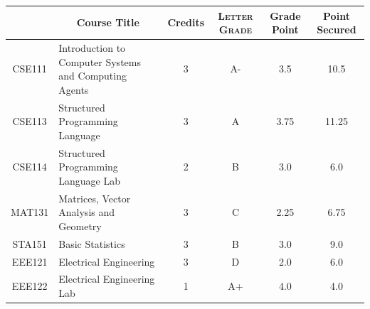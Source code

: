 \documentclass[11pt]{article}
\newcommand*{\numtwo}[1]{\pgfmathprintnumber[
                    fixed, precision=2, fixed zerofill=true]{#1}}
\begin{document}
                \begin{center}
                    \renewcommand{\arraystretch}{1.08}
                    
                \begin{tabular}{|c|l|c|>{\scshape}c|c|c|}
                \hline  \rule[-1ex]{0pt}{3.5ex} {\centering{\bf Course Code}} &  \multicolumn{1}{c|}{\textbf{Course Title}}  & {\bf Credits} & {\bf Letter Grade} & {\bf Grade Point} & {\bf Point Secured}  \\ 
                \hline   CSE111 &  Introduction to Computer Systems and Computing Agents		 & 3 & A- & 3.5 & 10.5 \\ %
                \hline   CSE113 &  Structured Programming Language		 & 3 & A & 3.75 & 11.25 \\ %
                \hline   CSE114 &  Structured Programming Language Lab		 & 2 & B & 3.0 & 6.0 \\ %
                \hline   MAT131 &  Matrices, Vector Analysis and Geometry		 & 3 & C & 2.25 & 6.75 \\ %
                \hline   STA151 &  Basic Statistics		 & 3 & B & 3.0 & 9.0 \\ %
                \hline   EEE121 &  Electrical Engineering		 & 3 & D & 2.0 & 6.0 \\ %
                \hline   EEE122 &  Electrical Engineering Lab		 & 1 & A+ & 4.0 & 4.0 \\ %

\hline                %
                \end{tabular}
                \end{center}
                \renewcommand{\arraystretch}{1.03}
\end{document}
